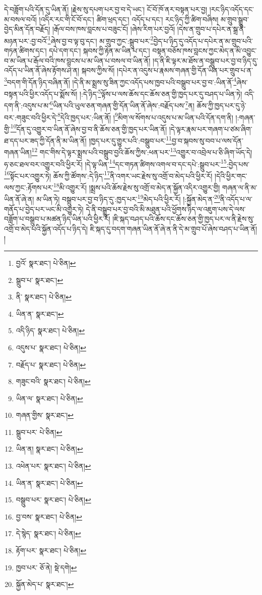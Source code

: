 དེ་བཟློག་པའི་དོན་དུ་ཡིན་ནོ། །རྗེས་སུ་དཔག་པར་བྱ་བ་དེ་ཡང་། ངོ་བོ་ཁོ་ནར་བསྟན་པར་བྱ། །རང་ཉིད་འདོད་དང་མ་བསལ་བའོ། །འདིར་རང་གི་ངོ་བོ་དང་། ཚིག་ཕྲད་དང་། འདོད་པ་དང་། རང་ཉིད་ཀྱི་ཚིག་བཞིས། མ་གྲུབ་སྒྲུབ་བྱེད་མིན་དོན་བརྗོད། །རྒོལ་བས་ཁས་བླངས་པ་བཟུང་ངོ། །ཞེས་རིག་པར་བྱའོ། །དེས་ན་གྲུབ་པ་དཔེར་ན་སྒྲ་ནི་མཉན་པར་:བྱ་བའོ་\footnote{བྱའོ་  སྣར་ཐང་།  པེ་ཅིན། }ཞེས་བྱ་བ་ལྟ་བུ་དང་། མ་གྲུབ་ཀྱང་:སྒྲུབ་པར་\footnote{སྒྲུབ་པ་  སྣར་ཐང་། }བྱེད་པ་ཉིད་དུ་འདོད་པ་དཔེར་ན་མ་གྲུབ་པའི་གཏན་ཚིགས་དང་། དཔེ་དག་དང་། སྐབས་ཀྱི་རྟེན་མ་ཡིན་པ་དང་། བསྟན་བཅོས་ཁས་བླངས་ཀྱང་མེད་ན་མི་འབྱུང་བ་མ་ཡིན་པ་རྒོལ་བའི་ཁས་བླངས་པ་མ་ཡིན་པ་བསལ་བ་ཡིན་ནོ། །ད་ནི་ཇི་ལྟར་མ་ཐོས་ན་བསྒྲུབ་པར་བྱ་བ་ཉིད་དུ་འདོད་པ་ཡིན་ནོ་ཞེས་རྟོགས་ཤེ་ན། སྐབས་ཀྱིས་སོ། །དཔེར་ན་འདུས་པ་རྣམས་གཞན་གྱི་དོན་ཡིན་པར་གྲུབ་པ་ན་\footnote{ནི་  སྣར་ཐང་།  པེ་ཅིན། }བདག་གི་དོན་ཉིད་བཞིན་ནོ། །དེ་ནི་མ་སྨྲས་སུ་ཟིན་ཀྱང་འདོད་པས་ཁྱབ་པའི་བསྒྲུབ་པར་བྱ་བ་:ཡིན་ནོ་\footnote{ཡིན་ན་  སྣར་ཐང་། }ཞེས་བསྟན་པའི་ཕྱིར་འདོད་པ་སྨོས་སོ། །:དེ་ཉིད་\footnote{འདི་ཉིད་  སྣར་ཐང་།  པེ་ཅིན། }ལྟོས་པ་ལས་ཆོས་དང་ཆོས་ཅན་གྱི་ཁྱད་པར་དུ་བཤད་པ་ཡིན་ཏེ། འདི་དག་ནི་:འདུས་པ་མ་\footnote{འདུས་པ་  སྣར་ཐང་།  པེ་ཅིན། }ཡིན་པའི་ཡུལ་ཅན་གཞན་གྱི་དོན་ཡིན་ནོ་ཞེས་:བརྗོད་པས་\footnote{བརྗོད་པ་  སྣར་ཐང་།  པེ་ཅིན། }ན། ཆོས་ཀྱི་ཁྱད་པར་དུ་ཉེ་བར་:གཟུང་བའི་ཕྱིར་དེ་\footnote{གཟུང་བའི་  སྣར་ཐང་།  པེ་ཅིན། }དེའི་ཁྱད་པར་:ཡིན་ནོ། །\footnote{ཡིན་ལ་  སྣར་ཐང་།  པེ་ཅིན། }མིག་ལ་སོགས་པ་འདུས་པ་མ་ཡིན་པའི་དོན་དག་ནི། །:གཞན་གྱི་\footnote{གཞན་གྱིས་  སྣར་ཐང་། }དོན་དུ་འགྱུར་བ་ཡིན་ནོ་ཞེས་བྱ་བ་ནི་ཆོས་ཅན་གྱི་ཁྱད་པར་ཡིན་ནོ། །དེ་ལྟར་རྣམ་པར་གཞག་པ་ཙམ་ཞིག་ཐ་དད་པར་ཟད་ཀྱི་དོན་ནི་མ་ཡིན་ནོ། །ཁྱད་པར་དུ་གྱུར་པའི་:བསྒྲུབ་པར་\footnote{སྒྲུབ་པར་  པེ་ཅིན། }བྱ་བ་སྐབས་སུ་བབ་པ་ལས་དོན་གཞན་ཡིན།\footnote{ཡིན་ན།  སྣར་ཐང་།  པེ་ཅིན། } གང་གིས་དེ་ལྟར་སྨྲས་པའི་བསྒྲུབ་བྱའི་ཆོས་ཀྱིས་:ཕན་པར་\footnote{འཕེན་པར་  སྣར་ཐང་།  པེ་ཅིན། }འགྱུར་བ་འབྲེལ་པ་ཅི་ཞིག་ཡོད་དེ། ཧ་ཅང་ཐལ་བར་འགྱུར་བའི་ཕྱིར་རོ། །དེ་ལྟ་ཡིན་\footnote{ཡིན་ན་  སྣར་ཐང་།  པེ་ཅིན། }དང་གཏན་ཚིགས་འགལ་བ་དང་དཔེ་:སྒྲུབ་པར་\footnote{བསྒྲུབ་པར་  སྣར་ཐང་།  པེ་ཅིན། }:བྱེད་པས་\footnote{བྱ་བས་  སྣར་ཐང་།  པེ་ཅིན། }སྟོང་པར་འགྱུར་ཏེ། ཆོས་ཀྱི་ཚོགས་:དེ་ཉིད་\footnote{དེ་སྙེད་  སྣར་ཐང་།  པེ་ཅིན། }ནི་འགར་ཡང་རྗེས་སུ་འགྲོ་བ་མེད་པའི་ཕྱིར་རོ། །དེའི་ཕྱིར་གང་ལས་ཀྱང་:རྟོགས་པར་\footnote{རྟོག་པར་  སྣར་ཐང་།  པེ་ཅིན། }མི་འགྱུར་རོ། །སྨྲས་པའི་ཆོས་རྗེས་སུ་འགྲོ་བ་མེད་ན་སྐྱོན་འདིར་འགྱུར་གྱི། གཞན་ལ་ནི་མ་ཡིན་ནོ་ཞེ་ན། མ་ཡིན་ཏེ། བསྒྲུབ་པར་བྱ་བ་ཉིད་དུ་:ཁྱད་པར་\footnote{ཁྱབ་པར་  ཅོ་ནེ།  སྡེ་དགེ། }མེད་པའི་ཕྱིར་རོ། །:སྐྱོན་མེད་ན་\footnote{སྐྱོན་མེད་པ་  སྣར་ཐང་། }ནི་འདོད་པ་ལ་གནོད་པ་བྱེད་པར་ཡང་མི་འགྱུར་ཏེ། དེ་ནི་བསྒྲུབ་པར་བྱ་བའི་མི་མཐུན་པའི་ཕྱོགས་ཉིད་ལ་འཇུག་པས་དེ་ལས་བཟློག་པ་བསྒྲུབ་པ་མཚན་ཉིད་ཡིན་པའི་ཕྱིར་རོ། །ཇི་སྐད་བཤད་པའི་ཆོས་དང་ཆོས་ཅན་གྱི་ཁྱད་པར་ལ་ནི་རྗེས་སུ་འགྲོ་བ་མེད་པའི་སྐྱོན་འདོད་པ་ཉིད་དེ། ཇི་སྐད་དུ་བདག་གཞན་ཡིན་ནོ་ཞེ་ན་ནི་དེ་མ་གྲུབ་པོ་ཞེས་བཤད་པ་ཡིན་ནོ། །
